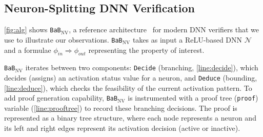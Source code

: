\documentclass[oneside,11pt,dvipsnames]{book}
\newcommand{\nnproofformat}{\texttt{APTP}}
\newcommand{\dd}{\texttt{BaB$_{\text{NV}}$}}
\newcommand{\neuralsat}{\texttt{NeuralSAT}}
\begin{document}


\subsection{Neuron-Splitting DNN Verification}\label{sec:bab}
\autoref{fig:alg} shows \dd{}, a reference architecture~\cite{nakagawa2014consolidating} 
for modern DNN verifiers that we use to illustrate our observations.  
\dd{} takes as input a ReLU-based DNN $\mathcal{N}$ and a formulae $\phi_{in}\Rightarrow \phi_{out}$ representing the property of interest.

\dd{} iterates between two components: \texttt{Decide} (branching, \autoref{line:decide}), which decides (assigns) an activation status value for a neuron, and \texttt{Deduce} (bounding, \autoref{line:deduce}), which checks the feasibility of the current activation pattern. 
To add proof generation capability, \dd{} is instrumented with a proof tree (\texttt{proof}) variable (\autoref{line:prooftree}) to record these branching decisions. The proof is represented as a binary tree structure, where each node represents a neuron and its left and right edges represent its activation decision (active or inactive). %
\end{document}
